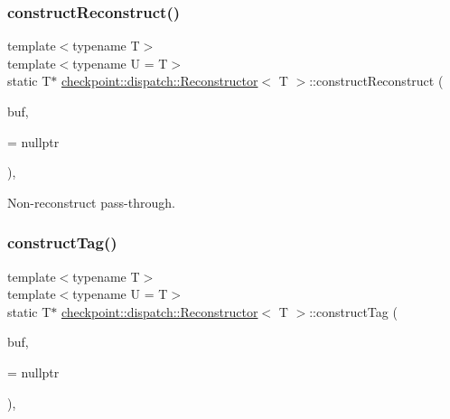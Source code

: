 \mbox{\label{structcheckpoint_1_1dispatch_1_1_reconstructor_a8a504054312ef8e5703d938cc2ef75be}} 
\subsubsection{\texorpdfstring{construct\+Reconstruct()}{constructReconstruct()}\hspace{0.1cm}{\footnotesize\ttfamily [4/4]}}
{\footnotesize\ttfamily template$<$typename T$>$ \\
template$<$typename U  = T$>$ \\
static T$\ast$ \hyperlink{structcheckpoint_1_1dispatch_1_1_reconstructor}{checkpoint\+::dispatch\+::\+Reconstructor}$<$ T $>$\+::construct\+Reconstruct (\begin{DoxyParamCaption}\item[{void $\ast$}]{buf,  }\item[{\hyperlink{namespacecheckpoint_a0054cbef71b90d6860e1d3916cf9d299}{is\+Not\+Reconstructible\+Type}$<$ U $>$ $\ast$}]{ = {\ttfamily nullptr} }\end{DoxyParamCaption})\hspace{0.3cm}{\ttfamily [inline]}, {\ttfamily [static]}}



Non-\/reconstruct pass-\/through. 

\mbox{\label{structcheckpoint_1_1dispatch_1_1_reconstructor_ac702decacef9a6ef4d0cf5492187b9ab}} 
\subsubsection{\texorpdfstring{construct\+Tag()}{constructTag()}\hspace{0.1cm}{\footnotesize\ttfamily [1/2]}}
{\footnotesize\ttfamily template$<$typename T$>$ \\
template$<$typename U  = T$>$ \\
static T$\ast$ \hyperlink{structcheckpoint_1_1dispatch_1_1_reconstructor}{checkpoint\+::dispatch\+::\+Reconstructor}$<$ T $>$\+::construct\+Tag (\begin{DoxyParamCaption}\item[{void $\ast$}]{buf,  }\item[{\hyperlink{namespacecheckpoint_abff0f367c546c94ce857d200153d990f}{is\+Tagged\+Constructible\+Type}$<$ U $>$ $\ast$}]{ = {\ttfamily nullptr} }\end{DoxyParamCaption})\hspace{0.3cm}{\ttfamily [inline]}, {\ttfamily [static]}}



